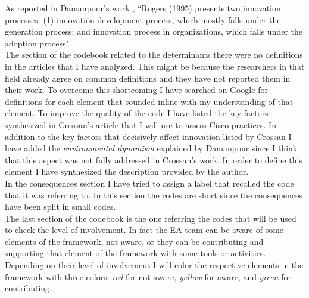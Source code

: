As reported in Damanpour's work \citep{damanpour2006}, ``Rogers (1995) presents two innovation processes: (1) innovation development process, which mostly falls under the generation process; and innovation process in organizations, which falls under the adoption process".
\\ %
The section of the codebook related to the determinants there were no definitions in the articles that I have analyzed. This might be because the researchers in that field already agree on common definitions and they have not reported them in their work.
To overcome this shortcoming I have searched on Google for definitions for each element that sounded inline with my understanding of that element. To improve the quality of the code I have listed the key factors synthesized in Crossan's article \citep{crossan2010} that I will use to assess Cisco practices.
In addition to the key factors that decisively affect innovation listed by Crossan I have added the \textit{environmental dynamism} explained by Damanpour \citep{damanpour1998} since I think that this aspect was not fully addressed in Crossan's work. In order to define this element I have synthesized the description provided by the author.
\\ %
In the consequences section I have tried to assign a label that recalled the code that it was referring to. In this section the codes are short since the consequences have been split in small codes.
\\ %
The last section of the codebook is the one referring the codes that will be used to check the level of involvement. In fact the EA team can be aware of some elements of the framework, not aware, or they can be contributing and supporting that element of the framework with some tools or activities. Depending on their level of involvement I will color the respective elements in the framework with three colors: \textit{red} for not aware, \textit{yellow} for aware, and \textit{green} for contributing.